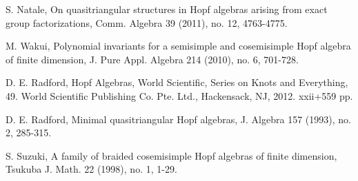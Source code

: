 \documentclass[a4paper,11pt]{amsart}
\numberwithin{equation}{section}
\begin{document}
\begin{thebibliography}{99}
 S. Natale, On quasitriangular structures in Hopf algebras arising from exact group
factorizations, Comm. Algebra 39 (2011), no. 12, 4763-4775.

 M. Wakui, Polynomial invariants for a semisimple and cosemisimple Hopf algebra of finite dimension, J. Pure Appl. Algebra 214 (2010), no. 6, 701-728.

 D. E. Radford, Hopf Algebras, World Scientific, Series on Knots and Everything, 49.
World Scientific Publishing Co. Pte. Ltd., Hackensack, NJ, 2012. xxii+559 pp.

 D. E. Radford, Minimal quasitriangular Hopf algebras, J. Algebra 157 (1993), no. 2, 285-315.

 S. Suzuki, A family of braided cosemisimple Hopf algebras of finite dimension, Tsukuba J. Math. 22 (1998), no. 1, 1-29.

\end{thebibliography}
\end{document}
